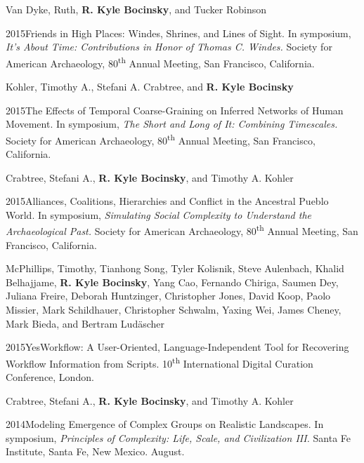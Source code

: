 Van Dyke, Ruth, {\bf R. Kyle Bocinsky}, and Tucker Robinson
\nopagebreak
\begin{list1}
\item[] 2015\hspace{.2cm}Friends in High Places: Windes, Shrines, and Lines of Sight. In symposium, \emph{It's About Time: Contributions in Honor of Thomas C. Windes.} Society for American Archaeology, 80\textsuperscript{th} Annual Meeting, San Francisco, California.
\end{list1}


Kohler, Timothy A., Stefani A. Crabtree, and {\bf R. Kyle Bocinsky}
\nopagebreak
\begin{list1}
\item[] 2015\hspace{.2cm}The Effects of Temporal Coarse-Graining on Inferred Networks of Human Movement. In symposium, \emph{The Short and Long of It: Combining Timescales.} Society for American Archaeology, 80\textsuperscript{th} Annual Meeting, San Francisco, California.
\end{list1}


Crabtree, Stefani A., {\bf R. Kyle Bocinsky}, and Timothy A. Kohler
\nopagebreak
\begin{list1}
\item[] 2015\hspace{.2cm}Alliances, Coalitions, Hierarchies and Conflict in the Ancestral
Pueblo World. In symposium, \emph{Simulating Social Complexity to Understand the Archaeological Past.} Society for American Archaeology, 80\textsuperscript{th} Annual Meeting, San Francisco, California.
\end{list1}


McPhillips, Timothy, Tianhong Song, Tyler Kolisnik, Steve Aulenbach, Khalid Belhajjame, {\bf R. Kyle Bocinsky}, Yang Cao, Fernando Chiriga, Saumen Dey, Juliana Freire, Deborah Huntzinger, Christopher Jones, David Koop, Paolo Missier, Mark Schildhauer, Christopher Schwalm, Yaxing Wei, James Cheney, Mark Bieda, and Bertram Lud\"ascher
\nopagebreak
\begin{list1}
\item[] 2015\hspace{.2cm}YesWorkflow: A User-Oriented, Language-Independent Tool for Recovering Workflow Information from Scripts. 10\textsuperscript{th} International Digital Curation Conference, London.
\end{list1}

\newpage
Crabtree, Stefani A., {\bf R. Kyle Bocinsky}, and Timothy A. Kohler
\nopagebreak
\begin{list1}
\item[] 2014\hspace{.2cm}Modeling Emergence of Complex Groups on Realistic Landscapes. In symposium, \emph{Principles of Complexity: Life, Scale, and Civilization III.} Santa Fe Institute, Santa Fe, New Mexico. August.
\end{list1}



